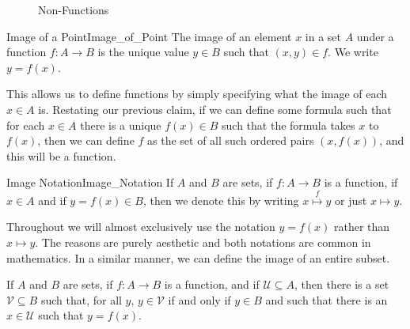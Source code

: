         \begin{figure}[H]
            \centering
            \begin{subfigure}[b]{0.49\textwidth}
                \centering
                \resizebox{\textwidth}{!}{%
                    
                }
            \end{subfigure}
            \begin{subfigure}[b]{0.49\textwidth}
                \centering
                \resizebox{\textwidth}{!}{%
                    
                }
            \end{subfigure}
            \caption{Non-Functions}
            \label{fig:Abstract_Non_Functions}
        \end{figure}
        \begin{fdefinition}{Image of a Point}{Image_of_Point}
            The image of an element $x$ in a set $A$ under a function
            $f:A\rightarrow{B}$ is the unique value $y\in{B}$ such that
            $(x,y)\in{f}$. We write $y=f(x)$.
        \end{fdefinition}
        This allows us to define functions by simply specifying what the
        image of each $x\in{A}$ is. Restating our previous claim, if we can
        define some formula such that for each $x\in{A}$ there is a unique
        $f(x)\in{B}$ such that the formula takes $x$ to $f(x)$, then we can
        define $f$ as the set of all such ordered pairs $(x,f(x))$, and this
        will be a function.
        \begin{fnotation}{Image Notation}{Image_Notation}
            If $A$ and $B$ are sets, if $f:A\rightarrow{B}$ is a function,
            if $x\in{A}$ and if $y=f(x)\in{B}$, then we denote this by
            writing $x\overset{f}{\longmapsto}{y}$ or just $x\mapsto{y}$.
        \end{fnotation}
        Throughout we will almost exclusively use the notation $y=f(x)$ rather
        than $x\mapsto{y}$. The reasons are purely aesthetic and both notations
        are common in mathematics. In a similar manner, we can define the image
        of an entire subset.
        \begin{theorem}
            If $A$ and $B$ are sets, if $f:A\rightarrow{B}$ is a function,
            and if $\mathcal{U}\subseteq{A}$, then there is a set
            $\mathcal{V}\subseteq{B}$ such that, for all $y$,
            $y\in\mathcal{V}$ if and only if $y\in{B}$ and such that there is
            an $x\in\mathcal{U}$ such that $y=f(x)$.
        \end{theorem}
